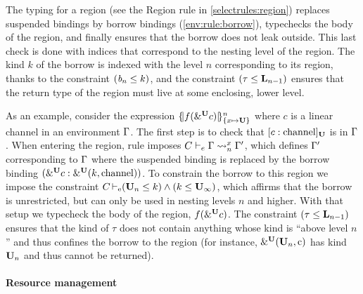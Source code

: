 The typing for a region (see the {\sc Region} rule in \cref{selectrules:region})
replaces suspended bindings by borrow bindings
(\cref{env:rule:borrow}), typechecks the body
of the region, and finally ensures that the borrow does not leak outside.
This last check is done with indices that correspond to the nesting
level of the region. The kind $k$ of the borrow is indexed with the level $n$
corresponding to its region, thanks to the constraint $(\BORROW_n\lk
k)$, and the constraint $\Cleq{\tau}{\klin_{n-1}}$ ensures that
the return type of the region must live at some enclosing, lower level.

As an example, consider the expression $\region{\Sone x\IBORROW}{f(\borrow[\IBORROW]{c})}$
where $c$ is a linear channel in an environment $\E$.
The first step is to check that $\svar[\IBORROW]{c}{\text{channel}}$
is in $\E$.
When entering the region, rule  imposes
$\lregion{C}{x}{\E}{\E'}$, which defines $\E'$
corresponding to $\E$ where the suspended binding is replaced by the
borrow binding  $\bvar{\borrow[\IBORROW]{c}}{\borrowty[\IBORROW]{k}{\text{channel}}}$.
To constrain the borrow to this region we impose the constraint
$\entail{C}{(\kun_n\lk k) \wedge (k \lk\kun_\infty)}$, which affirms
that the borrow is unrestricted, but can only be used in nesting
levels $n$ and higher.
With that setup we typecheck the body of the region,
$f(\borrow[\IBORROW]{c})$.
The constraint $\Cleq{\tau}{\klin_{n-1}}$ ensures
that the kind of $\tau$ does not contain anything whose kind is
``above level $n$'' and thus confines the borrow to the region
(for instance, $\borrowty[\IBORROW]{\kun_n}{\text{c}}$ has kind
$\kun_n$ and thus cannot be returned).







\paragraph{Resource management}

